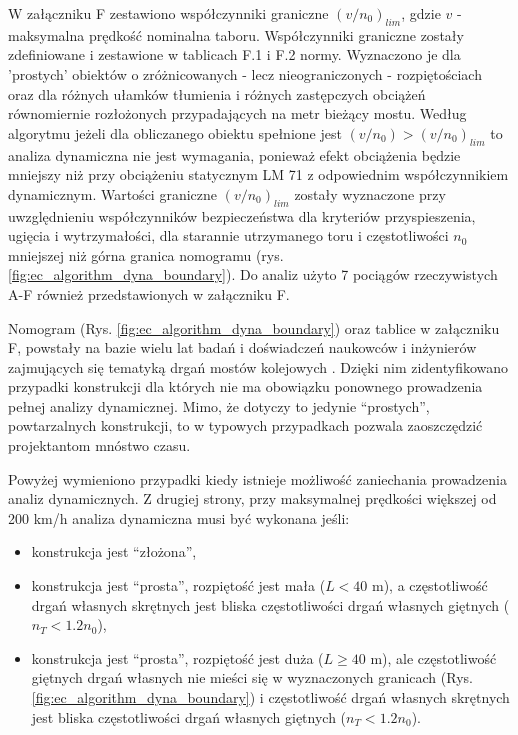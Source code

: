 W załączniku F zestawiono współczynniki graniczne $(v/n_0)_{lim}$, gdzie $v$ - maksymalna prędkość nominalna taboru. Współczynniki graniczne zostały zdefiniowane i zestawione w tablicach F.1 i F.2 normy. Wyznaczono je dla 'prostych' obiektów o zróżnicowanych - lecz nieograniczonych - rozpiętościach oraz dla różnych ułamków tłumienia i różnych zastępczych obciążeń równomiernie rozłożonych przypadających na metr bieżący mostu. Według algorytmu jeżeli dla obliczanego obiektu spełnione jest $(v/n_0)>(v/n_0)_{lim}$ to analiza dynamiczna nie jest wymagania, ponieważ efekt obciążenia będzie mniejszy niż przy obciążeniu statycznym LM 71 z odpowiednim współczynnikiem dynamicznym. Wartości graniczne $(v/n_0)_{lim}$ zostały wyznaczone przy uwzględnieniu współczynników bezpieczeństwa dla kryteriów przyspieszenia, ugięcia i wytrzymałości, dla starannie utrzymanego toru i częstotliwości $n_0$ mniejszej niż górna granica nomogramu (rys. \ref{fig:ec_algorithm_dyna_boundary}). Do analiz użyto 7 pociągów rzeczywistych A-F również przedstawionych w załączniku F. 

Nomogram (Rys. \ref{fig:ec_algorithm_dyna_boundary}) oraz tablice w załączniku F, powstały na bazie wielu lat badań i doświadczeń naukowców i inżynierów zajmujących się tematyką drgań mostów kolejowych \parencite{UnionInternationaleDesCheminsDeFer2009,ERRI1998}. Dzięki nim zidentyfikowano przypadki konstrukcji dla których nie ma obowiązku ponownego prowadzenia pełnej analizy dynamicznej. Mimo, że dotyczy to jedynie \enquote{prostych}, powtarzalnych konstrukcji, to w typowych przypadkach pozwala zaoszczędzić projektantom mnóstwo czasu. 


Powyżej wymieniono przypadki kiedy istnieje możliwość zaniechania prowadzenia analiz dynamicznych. Z drugiej strony, przy maksymalnej prędkości większej od 200 km/h analiza dynamiczna musi być wykonana jeśli:
\begin{itemize}
	\item konstrukcja jest \enquote{złożona},
	\item konstrukcja jest \enquote{prosta}, rozpiętość jest mała ($L < 40$ m), a częstotliwość drgań własnych skrętnych jest bliska częstotliwości drgań własnych giętnych ($n_T<1.2n_0$),
	\item konstrukcja jest \enquote{prosta}, rozpiętość jest duża ($L \ge 40$ m), ale częstotliwość giętnych drgań własnych nie mieści się w wyznaczonych granicach (Rys. \ref{fig:ec_algorithm_dyna_boundary}) i częstotliwość drgań własnych skrętnych jest bliska częstotliwości drgań własnych giętnych ($n_T<1.2n_0$).
\end{itemize}




